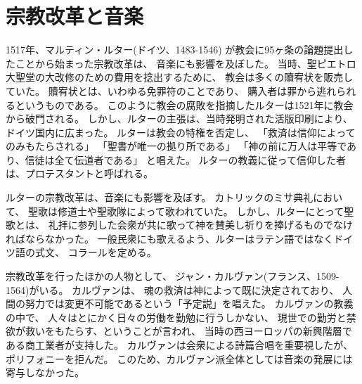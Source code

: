 \documentclass[a4j]{jarticle}
\begin{document}

\section{宗教改革と音楽}

1517年、マルティン・ルター(ドイツ、1483-1546)
が教会に95ヶ条の論題提出したことから始まった宗教改革は、
音楽にも影響を及ぼした。
当時、聖ピエトロ大聖堂の大改修のための費用を捻出するために、
教会は多くの贖宥状を販売していた。
贖宥状とは、いわゆる免罪符のことであり、
購入者は罪から逃れられるというものである。
このように教会の腐敗を指摘したルターは1521年に教会から破門される。
しかし、ルターの主張は、当時発明された活版印刷により、
ドイツ国内に広まった。
ルターは教会の特権を否定し、
「救済は信仰によってのみもたらされる」
「聖書が唯一の拠り所である」
「神の前に万人は平等であり、信徒は全て伝道者である」
と唱えた。
ルターの教義に従って信仰した者は、プロテスタントと呼ばれる。

ルターの宗教改革は、音楽にも影響を及ぼす。
カトリックのミサ典礼において、
聖歌は修道士や聖歌隊によって歌われていた。
しかし、ルターにとって聖歌とは、
礼拝に参列した会衆が共に歌って神を賛美し祈りを捧げるものでなければならなかった。
一般民衆にも歌えるよう、ルターはラテン語ではなくドイツ語の式文、
コラールを定める。

宗教改革を行ったほかの人物として、
ジャン・カルヴァン(フランス、1509-1564)がいる。
カルヴァンは、
魂の救済は神によって既に決定されており、
人間の努力では変更不可能であるという「予定説」を唱えた。
カルヴァンの教義の中で、
人々はとにかく日々の労働を勤勉に行うしかない、
現世での勤労と禁欲が救いをもたらす、ということが言われ、
当時の西ヨーロッパの新興階層である商工業者が支持した。
カルヴァンは会衆による詩篇合唱を重要視したが、
ポリフォニーを拒んだ。
このため、カルヴァン派全体としては音楽の発展には寄与しなかった。

\end{document}
